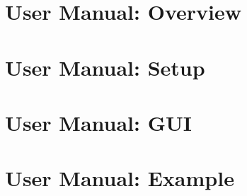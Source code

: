 \chapter{\dabc\ User Manual: Overview}
 \cleardoublepage
\chapter{\dabc\ User Manual: Setup}
 \cleardoublepage
\chapter{\dabc\ User Manual: GUI}
 \cleardoublepage
\chapter{\dabc\ User Manual: Example \mbs}
 \cleardoublepage

